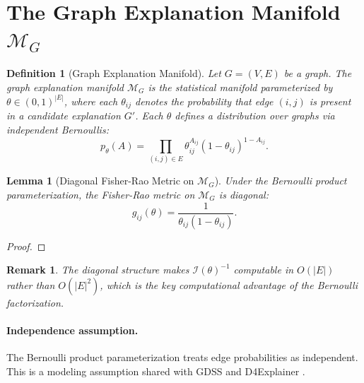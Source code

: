 \documentclass[11pt]{article}
\newcommand{\MG}{\mathcal{M}_G}
\newcommand{\thetaij}{\theta_{ij}}
\newtheorem{lemma}[theorem]{Lemma}
\newtheorem{remark}{Remark}
\newtheorem{definition}{Definition}
\begin{document}
\section{The Graph Explanation Manifold $\MG$}

\begin{definition}[Graph Explanation Manifold]
Let $G = (V,E)$ be a graph. The \emph{graph explanation manifold}
$\MG$ is the statistical manifold parameterized by
$\theta \in (0,1)^{|E|}$, where each $\thetaij$ denotes the
probability that edge $(i,j)$ is present in a candidate explanation
$G'$. Each $\theta$ defines a distribution over graphs via independent
Bernoullis:
\begin{equation}
  p_\theta(A) = \prod_{(i,j) \in E}
    \thetaij^{A_{ij}}(1 - \thetaij)^{1 - A_{ij}}.
\end{equation}
\end{definition}

\begin{lemma}[Diagonal Fisher-Rao Metric on $\MG$]
Under the Bernoulli product parameterization, the Fisher-Rao metric
on $\MG$ is diagonal:
\begin{equation}
  g_{ij}(\theta) = \frac{1}{\thetaij(1 - \thetaij)}.
\end{equation}
\end{lemma}
\begin{proof}
\end{proof}

\begin{remark}
  The diagonal structure makes $\mathcal{I}(\theta)^{-1}$ computable
  in $O(|E|)$ rather than $O(|E|^2)$, which is the key computational
  advantage of the Bernoulli factorization.
\end{remark}

\paragraph{Independence assumption.}
The Bernoulli product parameterization treats edge probabilities as
independent. This is a modeling assumption shared with GDSS
\citep{jo2022score} and D4Explainer \citep{chen2023d4explainer}.
\end{document}
